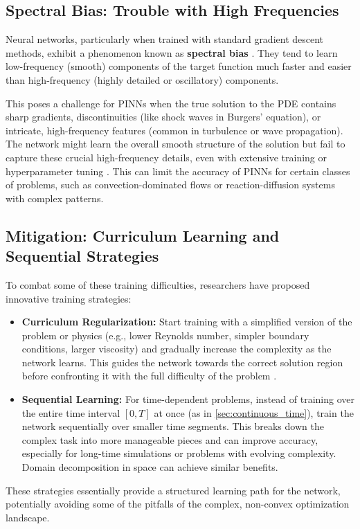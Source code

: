 \subsection{Spectral Bias: Trouble with High Frequencies}

Neural networks, particularly when trained with standard gradient descent methods, exhibit a phenomenon known as \textbf{spectral bias} \cite{rahaman2019spectral}. They tend to learn low-frequency (smooth) components of the target function much faster and easier than high-frequency (highly detailed or oscillatory) components.

This poses a challenge for PINNs when the true solution to the PDE contains sharp gradients, discontinuities (like shock waves in Burgers' equation), or intricate, high-frequency features (common in turbulence or wave propagation). The network might learn the overall smooth structure of the solution but fail to capture these crucial high-frequency details, even with extensive training or hyperparameter tuning \cite{krishnapriyan2021characterizing}. This can limit the accuracy of PINNs for certain classes of problems, such as convection-dominated flows or reaction-diffusion systems with complex patterns.

\subsection{Mitigation: Curriculum Learning and Sequential Strategies}

To combat some of these training difficulties, researchers have proposed innovative training strategies:

\begin{itemize}
    \item \textbf{Curriculum Regularization:} Start training with a simplified version of the problem or physics (e.g., lower Reynolds number, simpler boundary conditions, larger viscosity) and gradually increase the complexity as the network learns. This guides the network towards the correct solution region before confronting it with the full difficulty of the problem \cite{krishnapriyan2021characterizing}.
    \item \textbf{Sequential Learning:} For time-dependent problems, instead of training over the entire time interval $[0, T]$ at once (as in \cref{sec:continuous_time}), train the network sequentially over smaller time segments. This breaks down the complex task into more manageable pieces and can improve accuracy, especially for long-time simulations or problems with evolving complexity. Domain decomposition in space can achieve similar benefits.
\end{itemize}
These strategies essentially provide a structured learning path for the network, potentially avoiding some of the pitfalls of the complex, non-convex optimization landscape.

